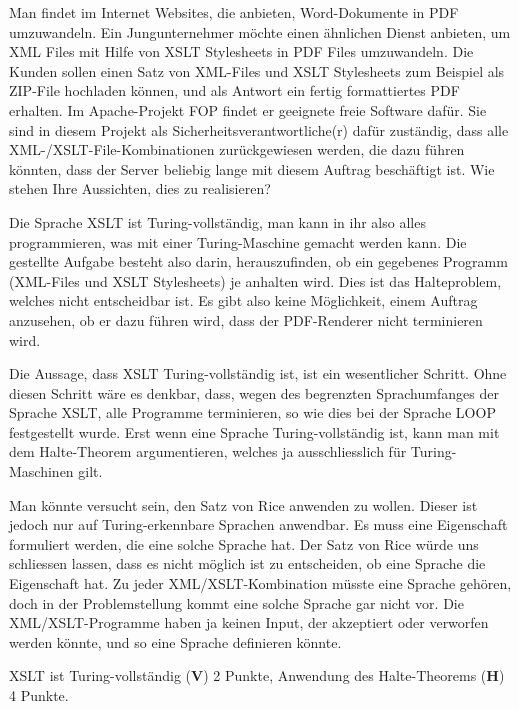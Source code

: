 Man findet im Internet Websites, die anbieten, Word-Dokumente in PDF
umzuwandeln.
Ein Jungunternehmer möchte einen ähnlichen Dienst anbieten, um XML Files
mit Hilfe von XSLT Stylesheets in PDF Files umzuwandeln.
Die Kunden sollen einen Satz von XML-Files und XSLT Stylesheets zum
Beispiel als ZIP-File hochladen können, und als Antwort ein fertig
formattiertes PDF erhalten.
Im Apache-Projekt FOP findet er geeignete freie Software dafür.
Sie sind in diesem Projekt als Sicherheitsverantwortliche(r) dafür zuständig,
dass alle XML-/XSLT-File-Kombinationen zurückgewiesen werden, die dazu führen
könnten, dass der Server beliebig lange mit diesem Auftrag beschäftigt ist.
Wie stehen Ihre Aussichten, dies zu realisieren?

\begin{loesung}
Die Sprache XSLT ist Turing-vollständig, man kann in ihr also alles
programmieren, was mit einer Turing-Maschine gemacht werden kann.
Die gestellte Aufgabe besteht also darin, herauszufinden, ob ein
gegebenes Programm (XML-Files und XSLT Stylesheets) je anhalten wird.
Dies ist das Halteproblem, welches nicht entscheidbar ist.
Es gibt also keine Möglichkeit, einem Auftrag anzusehen, ob er dazu
führen wird, dass der PDF-Renderer nicht terminieren wird.
\end{loesung}

\begin{diskussion}
Die Aussage, dass XSLT Turing-vollständig ist, ist ein wesentlicher Schritt.
Ohne diesen Schritt wäre es denkbar, dass, wegen des begrenzten Sprachumfanges
der Sprache XSLT, alle Programme terminieren, so wie dies bei der Sprache LOOP
festgestellt wurde.
Erst wenn eine Sprache Turing-vollständig ist, kann man mit dem Halte-Theorem
argumentieren, welches ja ausschliesslich für Turing-Maschinen gilt.

Man könnte versucht sein, den Satz von Rice anwenden zu wollen.
Dieser ist jedoch nur auf Turing-erkennbare Sprachen anwendbar.
Es muss eine Eigenschaft formuliert werden, die eine solche Sprache hat. 
Der Satz von Rice würde uns schliessen lassen, dass es nicht möglich ist
zu entscheiden, ob eine Sprache die Eigenschaft hat.
Zu jeder XML/XSLT-Kombination müsste eine Sprache gehören, doch
in der Problemstellung kommt eine solche Sprache gar nicht vor.
Die XML/XSLT-Programme haben ja keinen Input, der akzeptiert oder
verworfen werden könnte, und so eine Sprache definieren könnte.
\end{diskussion}

\begin{bewertung}
XSLT ist Turing-vollständig ({\bf V}) 2 Punkte,
Anwendung des Halte-Theorems ({\bf H}) 4 Punkte.
\end{bewertung}
